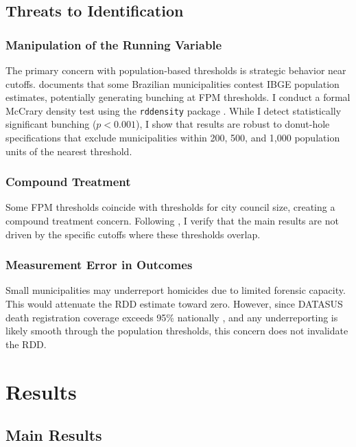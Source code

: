 \documentclass[12pt]{article}
\begin{document}
\subsection{Threats to Identification}

\subsubsection*{Manipulation of the Running Variable} The primary concern with population-based thresholds is strategic behavior near cutoffs. \citet{litschig2012internal} documents that some Brazilian municipalities contest IBGE population estimates, potentially generating bunching at FPM thresholds. I conduct a formal McCrary density test using the \texttt{rddensity} package \citep{cattaneo2020rddensity}. While I detect statistically significant bunching ($p < 0.001$), I show that results are robust to donut-hole specifications that exclude municipalities within 200, 500, and 1,000 population units of the nearest threshold.

\subsubsection*{Compound Treatment} Some FPM thresholds coincide with thresholds for city council size, creating a compound treatment concern. Following \citet{corbi2019fiscal}, I verify that the main results are not driven by the specific cutoffs where these thresholds overlap.

\subsubsection*{Measurement Error in Outcomes} Small municipalities may underreport homicides due to limited forensic capacity. This would attenuate the RDD estimate toward zero. However, since DATASUS death registration coverage exceeds 95\% nationally \citep{cerqueira2017atlas}, and any underreporting is likely smooth through the population thresholds, this concern does not invalidate the RDD.

\section{Results}

\subsection{Main Results}
\end{document}
